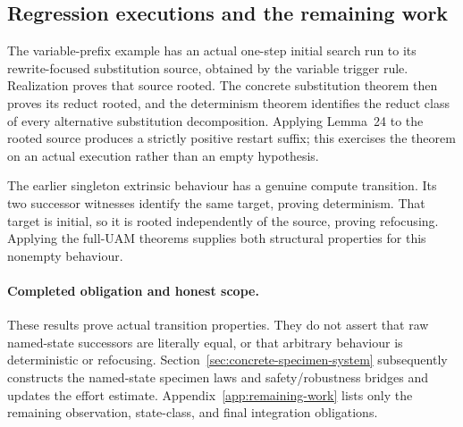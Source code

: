 \subsection{Regression executions and the remaining work}

The variable-prefix example has an actual one-step initial search run to its
rewrite-focused substitution source, obtained by the variable trigger rule.
Realization proves that source rooted. The concrete substitution theorem then
proves its reduct rooted, and the determinism theorem identifies the reduct
class of every alternative substitution decomposition. Applying Lemma~24 to
the rooted source produces a strictly positive restart suffix; this exercises
the theorem on an actual execution rather than an empty hypothesis.


The earlier singleton extrinsic behaviour has a genuine compute transition.
Its two successor witnesses identify the same target, proving determinism.
That target is initial, so it is rooted independently of the source, proving
refocusing. Applying the full-UAM theorems supplies both structural properties
for this nonempty behaviour.


\paragraph{Completed obligation and honest scope.}
These results prove actual transition properties. They do not assert that raw
named-state successors are literally equal, or that arbitrary behaviour is
deterministic or refocusing. Section~\ref{sec:concrete-specimen-system} subsequently
constructs the named-state specimen laws and safety/robustness bridges and
updates the effort estimate. Appendix~\ref{app:remaining-work} lists only the
remaining observation, state-class, and final integration obligations.
